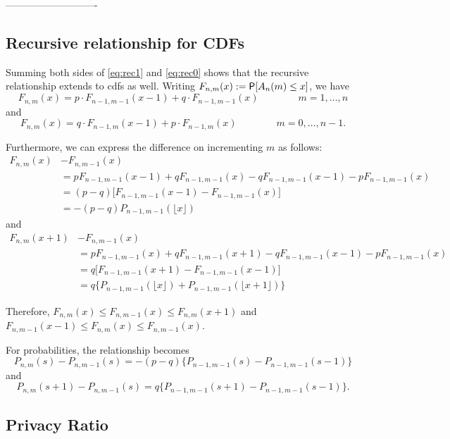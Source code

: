 \documentclass[11pt,draft]{article}
\begin{document}
----------------------------


\subsection{Recursive relationship for CDFs}

Summing both sides of \eqref{eq:rec1} and \eqref{eq:rec0} shows that the recursive relationship extends to cdfs as well.
Writing $F_{n,m}(x) := \P[A_n(m) \leq x]$, we have
\begin{equation*}%
F_{n,m}(x) = p\cdot F_{n-1,m-1}(x-1) + q\cdot F_{n-1,m-1}(x)
\qquad\qquad m = 1,\dots,n
\end{equation*}
and 
\begin{equation*}%
F_{n,m}(x) = q\cdot F_{n-1,m}(x-1) + p\cdot F_{n-1,m}(x)
\qquad\qquad m = 0,\dots,n-1.
\end{equation*}

Furthermore, we can express the difference on incrementing $m$ as follows:
\begin{align*}
 F_{n,m}(x) &- F_{n,m-1}(x) \\
&= p F_{n-1,m-1}(x-1) + q F_{n-1,m-1}(x) - q F_{n-1,m-1}(x-1)
 - p F_{n-1,m-1}(x) \\
&= (p-q) \big[ F_{n-1,m-1}(x-1) - F_{n-1,m-1}(x) \big] \\
&= -(p-q) P_{n-1, m-1}(\lfloor x \rfloor)
\end{align*}
and
\begin{align*}
 F_{n,m}(x+1) &- F_{n,m-1}(x) \\
&= p F_{n-1,m-1}(x) + q F_{n-1,m-1}(x+1) - q F_{n-1,m-1}(x-1)
 - p F_{n-1,m-1}(x) \\
&= q\big[ F_{n-1,m-1}(x+1) - F_{n-1,m-1}(x-1) \big] \\
&= q\big\{ P_{n-1, m-1}(\lfloor x \rfloor) +
P_{n-1, m-1}(\lfloor x+1 \rfloor) \big\}
\end{align*}

Therefore, $F_{n,m}(x) \leq F_{n,m-1}(x) \leq F_{n,m}(x+1)$ and $F_{n,m-1}(x-1) \leq F_{n,m}(x) \leq F_{n,m-1}(x)$.

For probabilities, the relationship becomes
\[
P_{n, m}(s) - P_{n, m-1}(s) = -(p-q) \big\{ P_{n-1, m-1}(s) - P_{n-1, m-1}(s-1) \big\}
\]
and
\[
P_{n, m}(s+1) - P_{n, m-1}(s) = q \big\{ P_{n-1, m-1}(s+1) - P_{n-1, m-1}(s-1) \big\}.
\]


\subsection{Privacy Ratio}
\end{document}

